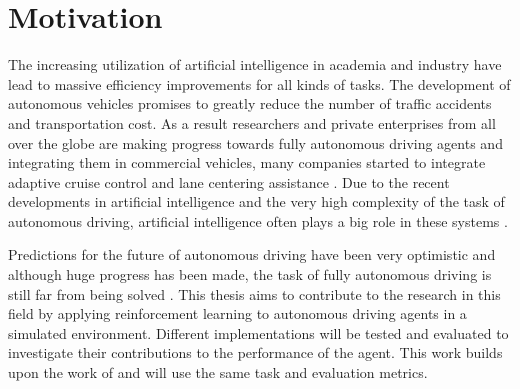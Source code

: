 \chapter{Motivation}
\label{cha:Motivation}

The increasing utilization of artificial intelligence in academia and industry have lead to massive efficiency improvements for all kinds of tasks. The development of autonomous vehicles promises to greatly reduce the number of traffic accidents and transportation cost. As a result researchers and private enterprises from all over the globe are making progress towards fully autonomous driving agents and integrating them in commercial vehicles, many companies started to integrate adaptive cruise control and lane centering assistance \autocite{carreviews}. Due to the recent developments in artificial intelligence and the very high complexity of the task of autonomous driving, artificial intelligence often plays a big role in these systems \autocite{teslaEndToEnd}.

Predictions for the future of autonomous driving have been very optimistic and although huge progress has been made, the task of fully autonomous driving is still far from being solved \autocite{state_of_autonomous_driving2023}. This thesis aims to contribute to the research in this field by applying reinforcement learning to autonomous driving agents in a simulated environment. Different implementations will be tested and evaluated to investigate their contributions to the performance of the agent. This work builds upon the work of \autocite{maximilian} and will use the same task and evaluation metrics. %

